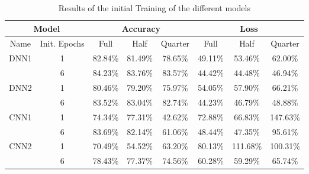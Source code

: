 \begin{table}
    \centering
    \caption{Results of the initial Training of the different models}
    \begin{tabular}{|cc|ccc|ccc|}
        \hline
        \multicolumn{2}{|c|}{Model} & \multicolumn{3}{c|}{Accuracy} & \multicolumn{3}{c|}{Loss} \\ \hline
        \multicolumn{1}{|c|}{Name}                  & Init. Epochs & \multicolumn{1}{c|}{Full}    & \multicolumn{1}{c|}{Half}    & Quarter & \multicolumn{1}{c|}{Full}    & \multicolumn{1}{c|}{Half}     & Quarter  \\ \hline
        \multicolumn{1}{|c|}{\multirow{2}{*}{DNN1}} & 1              & \multicolumn{1}{c|}{82.84\%} & \multicolumn{1}{c|}{81.49\%} & 78.65\% & \multicolumn{1}{c|}{49.11\%} & \multicolumn{1}{c|}{53.46\%}  & 62.00\%  \\ \cline{2-8}
        \multicolumn{1}{|c|}{}                      & 6              & \multicolumn{1}{c|}{84.23\%} & \multicolumn{1}{c|}{83.76\%} & 83.57\% & \multicolumn{1}{c|}{44.42\%} & \multicolumn{1}{c|}{44.48\%}  & 46.94\%  \\ \hline
        \multicolumn{1}{|c|}{\multirow{2}{*}{DNN2}} & 1              & \multicolumn{1}{c|}{80.46\%} & \multicolumn{1}{c|}{79.20\%} & 75.97\% & \multicolumn{1}{c|}{54.05\%} & \multicolumn{1}{c|}{57.90\%}  & 66.21\%  \\ \cline{2-8}
        \multicolumn{1}{|c|}{}                      & 6              & \multicolumn{1}{c|}{83.52\%} & \multicolumn{1}{c|}{83.04\%} & 82.74\% & \multicolumn{1}{c|}{44.23\%} & \multicolumn{1}{c|}{46.79\%}  & 48.88\%  \\ \hline
        \multicolumn{1}{|c|}{\multirow{2}{*}{CNN1}} & 1              & \multicolumn{1}{c|}{74.34\%} & \multicolumn{1}{c|}{77.31\%} & 42.62\% & \multicolumn{1}{c|}{72.88\%} & \multicolumn{1}{c|}{66.83\%}  & 147.63\% \\ \cline{2-8}
        \multicolumn{1}{|c|}{}                      & 6              & \multicolumn{1}{c|}{83.69\%} & \multicolumn{1}{c|}{82.14\%} & 61.06\% & \multicolumn{1}{c|}{48.44\%} & \multicolumn{1}{c|}{47.35\%}  & 95.61\%  \\ \hline
        \multicolumn{1}{|c|}{\multirow{2}{*}{CNN2}} & 1              & \multicolumn{1}{c|}{70.49\%} & \multicolumn{1}{c|}{54.52\%} & 63.20\% & \multicolumn{1}{c|}{80.13\%} & \multicolumn{1}{c|}{111.68\%} & 100.31\% \\ \cline{2-8}
        \multicolumn{1}{|c|}{}                      & 6              & \multicolumn{1}{c|}{78.43\%} & \multicolumn{1}{c|}{77.37\%} & 74.56\% & \multicolumn{1}{c|}{60.28\%} & \multicolumn{1}{c|}{59.29\%}  & 65.74\%  \\ \hline
    \end{tabular}
    \label{tab:results}
\end{table}